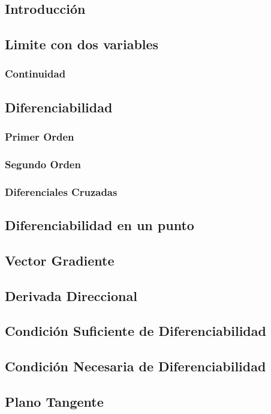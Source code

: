 \subsection{Introducción}
\subsection{Limite con dos variables}
\subsubsection{Continuidad}
\subsection{Diferenciabilidad}
\subsubsection{Primer Orden}
\subsubsection{Segundo Orden}
\subsubsection{Diferenciales Cruzadas}
\subsection{Diferenciabilidad en un punto}
\subsection{Vector Gradiente}
\subsection{Derivada Direccional}
\subsection{Condición Suficiente de Diferenciabilidad}
\subsection{Condición Necesaria de Diferenciabilidad}
\subsection{Plano Tangente}

